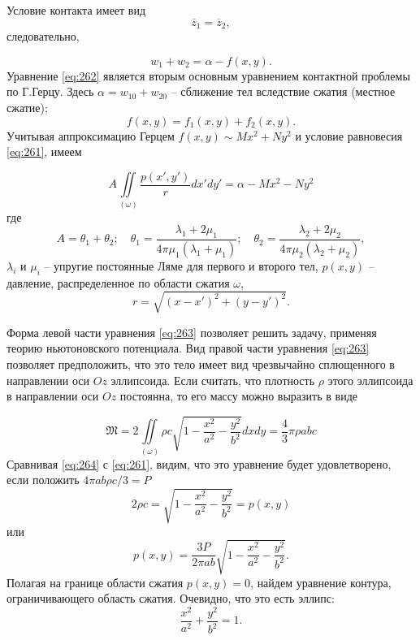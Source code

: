 \documentclass[specialist, subf, href, colorlinks=true, 14pt, final]{disser}
\theoremstyle{definition}
\begin{document}
Условие контакта имеет вид
\[ \overline{z}_1 = \overline{z}_2, \]
следовательно,
\addtocounter{equation}{1}
\begin{equation}\label{eq:262}
  w_{1} + w_{2} = \alpha - f(x,y).
  \tag{2}
\end{equation} 
Уравнение \eqref{eq:262} является вторым основным уравнением контактной проблемы по Г.Герцу. Здесь $\alpha = w_{10} + w_{20}$ -- сближение тел вследствие сжатия (местное сжатие);
\[
  f(x,y) = f_{1}(x,y) + f_{2}(x,y).
\]
Учитывая аппроксимацию Герцем $f(x,y) \sim Mx^{2} + Ny^{2}$ и условие равновесия \eqref{eq:261}, имеем
\addtocounter{equation}{1}
\begin{equation}\label{eq:263}
   A \iint\limits_{(\omega)} \frac{p(x',y')}{r} dx' dy' = \alpha - M x^2 - N y^2
  \tag{3}
\end{equation}
где
\[
  A = \theta_1 + \theta_2; \quad \theta_1 = \displaystyle \frac{\lambda_1 + 2\mu_1}{4 \pi \mu_1 (\lambda_1 + \mu_1)}; \quad \theta_2 = \displaystyle \frac{\lambda_2 + 2\mu_2}{4 \pi \mu_2 (\lambda_2 + \mu_2)},
\]
$\lambda_i$ и $\mu_i$ -- упругие постоянные Ляме для первого и второго тел, $p(x,y)$ -- давление, распределенное по области сжатия $\omega$,
\[
  r = \sqrt{(x-x')^{2} + (y-y')^{2}}.
\]

Форма левой части уравнения \eqref{eq:263} позволяет решить задачу, применяя теорию ньютоновского потенциала. Вид правой части уравнения \eqref{eq:263} позволяет предположить, что это тело имеет вид чрезвычайно сплющенного в направлении оси $Oz$ эллипсоида. Если считать, что плотность $\rho$ этого эллипсоида в направлении оси $Oz$ постоянна, то его массу можно выразить в виде
\addtocounter{equation}{1}
\begin{equation}\label{eq:264}
   \mathfrak{M} = 2 \iint\limits_{(\omega)} \rho c \sqrt{1 - \frac{x^2}{a^2} - \frac{y^2}{b^2}} dx dy = \frac{4}{3} \pi \rho a b c 
  \tag{4}
\end{equation}
Сравнивая \eqref{eq:264} с \eqref{eq:261}, видим, что это уравнение будет удовлетворено, если положить $4\pi ab\rho c / 3 = P$
\[ 
2 \rho c = \sqrt{1 - \frac{x^2}{a^2} - \frac{y^2}{b^2}} = p(x,y) 
\]
или
\[ p(x,y) = \frac{3P}{2 \pi a b} \sqrt{1 - \frac{x^2}{a^2} - \frac{y^2}{b^2}} . \]
Полагая на границе области сжатия $p(x,y) = 0$, найдем уравнение контура, ограничивающего область сжатия. Очевидно, что это есть эллипс:
\[ \frac{x^2}{a^2} + \frac{y^2}{b^2} = 1 .\]
\end{document}
